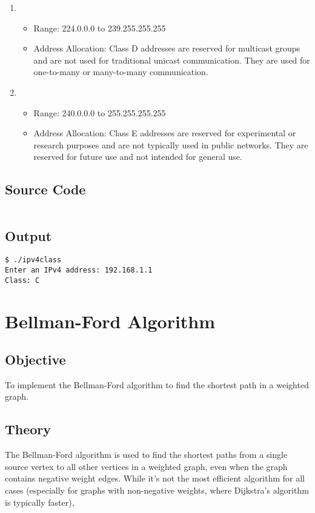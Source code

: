 \documentclass{korigamik}
\begin{document}
\begin{enumerate}[label=\textbf{Class \Alph*:}, leftmargin=2cm]
	\item \begin{itemize}
		      \item Range: 224.0.0.0 to 239.255.255.255
          \item Address Allocation: Class D addresses are reserved for
            multicast groups and are not used for traditional unicast
            communication. They are used for one-to-many or many-to-many
            communication.
	      \end{itemize}
	      
	\item \begin{itemize}
		      \item Range: 240.0.0.0 to 255.255.255.255
          \item Address Allocation: Class E addresses are reserved for
            experimental or research purposes and are not typically used in
            public networks. They are reserved for future use and not intended
            for general use.
	      \end{itemize}
\end{enumerate}


\subsection{Source Code}
\inputminted[firstline=5, lastline=25]{cpp}{code/ipv4class.cpp}
\subsection{Output}
\begin{lstlisting}[style=output]
$ ./ipv4class
Enter an IPv4 address: 192.168.1.1
Class: C
\end{lstlisting}

\pagebreak

\section{Bellman-Ford Algorithm}
\label{sec:Bellman-Ford Algorithm}

\subsection{Objective}
To implement the Bellman-Ford algorithm to find the shortest path
in a weighted graph.

\subsection{Theory}
The Bellman-Ford algorithm is used to find the shortest paths from a 
single source vertex to all other vertices in a weighted graph, even when the
graph contains negative weight edges. While it's not the most efficient
algorithm for all cases (especially for graphs with non-negative weights, where
Dijkstra's algorithm is typically faster),
\end{document}
